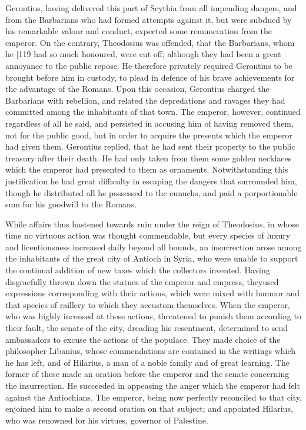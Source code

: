 Gerontius, having delivered this part of Scythia from all impending dangers, and from the Barbarians who had formed attempts against it, but were subdued by his remarkable valour and conduct, expected some remuneration from the emperor. On the contrary, Theodosius was offended, that the Barbarians, whom he
|119
had so much honoured, were cut off; although they had been a great annoyance to the public repose. He therefore privately required Gerontius to be brought before him in custody, to plead in defence of his brave achievements for the advantage of the Romans. Upon this occasion, Gerontius charged the Barbarians with rebellion, and related the depredations and ravages they had committed among the inhabitants of that town. The emperor, however, continued regardless of all he said, and persisted in accusing him of having removed them, not for the public good, but in order to acquire the presents which the emperor had given them. Gerontius replied, that he had sent their property to the public treasury after their death. He had only taken from them some golden necklaces which the emperor had presented to them as ornaments. Notwithstanding this justification he had great difficulty in escaping the dangers that surrounded him, though he distributed all he possessed to the eunuchs, and paid a porportionable sum for his goodwill to the Romans.

While affairs thus hastened towards ruin under the reign of Theodosius, in whose time no virtuous action was thought commendable, but every species of luxury and licentiousness increased daily beyond all bounds, an insurrection arose among the inhabitants of the great city of Antioch in Syria, who were unable to support the continual addition of new taxes which the collectors invented. Having disgracfully thrown down the statues of the emperor and empress, they\emph{}used expressions corresponding with their actions, which were mixed with humour and that species of raillery to which they accustom themselves. When the emperor, who was highly incensed at these actions, threatened to punish them according to their fault, the senate of the city, dreading his resentment, determined to send ambassadors to excuse the actions of the populace. They made choice of the philosopher Libanius, whose commendations are contained in the writings which he has left, and of Hilarius, a man of a noble family and of great learning. The former of these made an oration before the emperor and the senate concerning the insurrection. He succeeded in appeasing the anger which the emperor had felt against the Antiochians. The emperor, being now perfectly reconciled to that city, enjoined him to make a second oration on that subject; and appointed Hilarius, who was renowned for his virtues, governor of Palestine.

